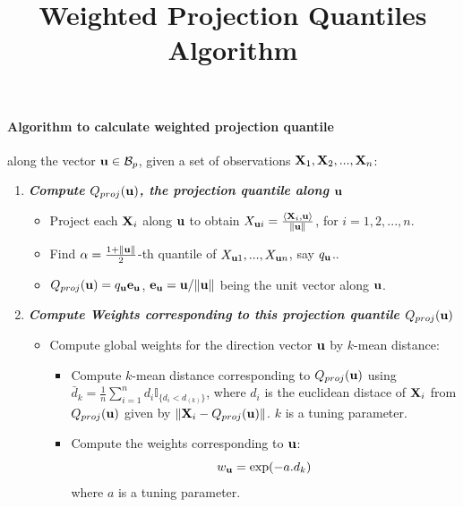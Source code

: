 \documentclass{article}
\title{Weighted Projection Quantiles Algorithm}
\begin{document}
\maketitle

\paragraph{Algorithm to calculate weighted projection quantile} along the vector ${\bf{u}} \in\mathcal B_p$, given a set of observations ${\mathbf{X}}_1,{\mathbf{X}}_2,...,{\mathbf{X}}_n$:

\begin{enumerate}

\item \textbf{\textit{Compute $Q_{proj}({\bf{u}})$, the projection quantile along ${\bf{u}}$}}

\begin{itemize}
\item Project each ${\mathbf{X}}_i$ along ${\bf{u}}$ to obtain $X_{{\bf{u}} i}=\frac{\langle{\mathbf{X}}_i,{\bf{u}}\rangle}{\|{\bf{u}}\|}$, for $i=1,2,...,n$.
\item Find $\alpha=\frac{1+\|{\bf{u}}\|}{2}$-th quantile of $X_{{\bf{u}} 1},...,X_{{\bf{u}} n}$, say $q_{\bf{u}}$..
\item $Q_{proj}({\bf{u}})=q_{\bf{u}}{\bf{e}}_{\bf{u}}$, ${\bf{e}}_{\bf{u}}={\bf{u}}/\|{\bf{u}}\|$ being the unit vector along ${\bf{u}}$.

\end{itemize}

\item \textit{\textbf{Compute Weights corresponding to this projection quantile $Q_{proj}({\bf{u}})$}}

\begin{itemize}

\item Compute global weights for the direction vector ${\bf{u}}$ by $k$-mean distance:

\begin{itemize}
\item Compute $k$-mean distance corresponding to $Q_{proj}({\bf{u}})$ using $\bar d_k=\frac{1}{n}\sum_{i=1}^nd_i\mathbb{I}_{\{d_i<d_{(k)}\}}$, where $d_i$ is the euclidean distace of ${\mathbf{X}}_i$ from $Q_{proj}({\bf{u}})$ given by $\|{\mathbf{X}}_i-Q_{proj}({\bf{u}})\|$. $k$ is a tuning parameter.\\

\item Compute the weights corresponding to ${\bf{u}}$:
$$w_{\bf{u}}=\exp(-a.d_k)$$
where $a$ is a tuning parameter. 
\end{itemize}


\end{itemize}
\end{enumerate}
\end{document}

